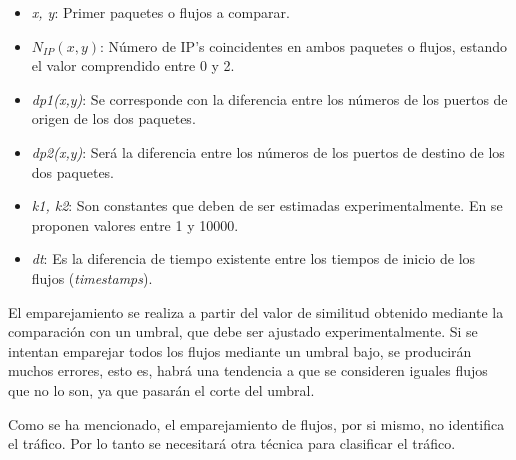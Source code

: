 \begin{itemize}
\item \textit{x, y}: Primer paquetes o flujos a comparar.
\item \textit{$N_{IP}(x,y)$}: Número de IP's coincidentes en ambos paquetes o flujos, estando el valor comprendido entre 0 y 2.
\item \textit{dp1(x,y)}: Se corresponde con la diferencia entre los números de los puertos de origen de los dos paquetes.
\item \textit{dp2(x,y)}: Será la diferencia entre los números de los puertos de destino de los dos paquetes.
\item \textit{k1, k2}: Son constantes que deben de ser estimadas experimentalmente. En \cite{comparacion} se proponen valores entre 1 
y 10000.
\item \textit{dt}: Es la diferencia de tiempo existente entre los tiempos de inicio de los flujos (\textit{timestamps}).
\end{itemize}

\intro El emparejamiento se realiza a partir del valor de similitud obtenido mediante la comparación con un umbral, que debe ser 
ajustado experimentalmente. Si se intentan emparejar todos los flujos mediante un umbral bajo, se producirán muchos errores, esto es, 
habrá una tendencia a que se consideren iguales flujos que no lo son, ya que pasarán el corte del umbral.

\intro Como se ha mencionado, el emparejamiento de flujos, por si mismo, no identifica el tráfico. Por lo tanto se 
necesitará otra técnica para clasificar el tráfico.
